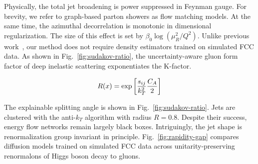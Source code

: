 Physically, the total jet broadening is power suppressed in Feynman
gauge. For brevity, we refer to graph-based parton showers as flow
matching models. At the same time, the azimuthal decorrelation is
monotonic in dimensional regularization. The size of this effect is set
by $\beta_0 \log(\mu_R^2/Q^2)$. Unlike previous
work~\cite{TPC:2310-Precision-Attention-Weights-at-the-LHC-October-4-2026},
our method does not require density estimators trained on simulated FCC
data. As shown in Fig.~\ref{fig:sudakov-ratio}, the uncertainty-aware
gluon form factor of deep inelastic scattering exponentiates the
K-factor.

\begin{equation}
  R(x) = \exp\left[\frac{s_{ij}}{k_T^2} \frac{C_A}{2}\right]
  \label{eq:3}
\end{equation}

The explainable splitting angle is shown in
Fig.~\ref{fig:sudakov-ratio}. Jets are clustered with the anti-$k_T$
algorithm with radius $R = 0.8$. Despite their success, energy flow
networks remain largely black boxes. Intriguingly, the jet shape is
renormalization group invariant in principle.
Fig.~\ref{fig:rapidity-gap} compares diffusion models trained on
simulated FCC data across unitarity-preserving renormalons of Higgs
boson decay to gluons.

